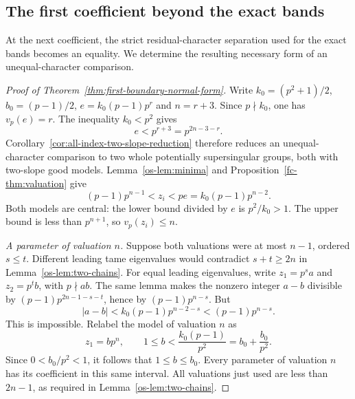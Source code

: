 \subsection{The first coefficient beyond the exact bands}
\label{sec:first-boundary-normal-form}

At the next coefficient, the strict residual-character separation
used for the exact bands becomes an equality. We determine the
resulting necessary form of an unequal-character comparison.

\begin{proof}[Proof of Theorem~\ref{thm:first-boundary-normal-form}]
Write $k_0=(p^2+1)/2$, $b_0=(p-1)/2$, $e=k_0(p-1)p^r$ and
$n=r+3$. Since $p\nmid k_0$, one has $v_p(e)=r$. The inequality
$k_0<p^2$ gives
\[
 e<p^{r+3}=p^{2n-3-r}.
\]
Corollary~\ref{cor:all-index-two-slope-reduction} therefore reduces
an unequal-character comparison to two whole potentially
supersingular groups, both with two-slope good models.
Lemma~\ref{os-lem:minima} and Proposition~\ref{fc-thm:valuation}
give
\begin{equation}\label{os-eq:first-boundary-range}
 (p-1)p^{n-1}<z_i<pe=k_0(p-1)p^{n-2}.
\end{equation}
Both models are central: the lower bound divided by $e$ is
$p^2/k_0>1$. The upper bound is less than $p^{n+1}$, so
$v_p(z_i)\le n$.

\smallskip\noindent
\emph{A parameter of valuation $n$.}
Suppose both valuations were at most $n-1$, ordered $s\le t$.
Different leading tame eigenvalues would contradict
$s+t\ge2n$ in Lemma~\ref{os-lem:two-chains}. For equal leading
eigenvalues, write $z_1=p^sa$ and $z_2=p^tb$, with $p\nmid ab$.
The same lemma makes the nonzero integer $a-b$ divisible by
$(p-1)p^{2n-1-s-t}$, hence by $(p-1)p^{n-s}$. But
\[
 |a-b|<k_0(p-1)p^{n-2-s}<(p-1)p^{n-s}.
\]
This is impossible. Relabel the model of valuation $n$ as
\begin{equation}\label{os-eq:first-boundary-high}
 z_1=bp^n,\qquad
 1\le b<\frac{k_0(p-1)}{p^2}
       =b_0+\frac{b_0}{p^2}.
\end{equation}
Since $0<b_0/p^2<1$, it follows that $1\le b\le b_0$.
Every parameter of valuation $n$ has its coefficient in this
same interval. All valuations just used are less than $2n-1$,
as required in Lemma~\ref{os-lem:two-chains}.


\end{proof}
